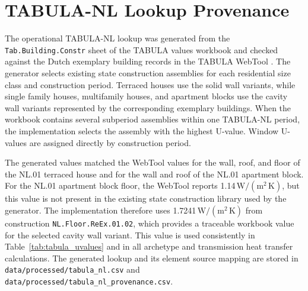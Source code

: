 \section{TABULA-NL Lookup Provenance}
\label{sec:appendix_a_tabula}

The operational TABULA-NL lookup was generated from the \texttt{Tab.Building.Constr} sheet of the TABULA values workbook and checked against the Dutch exemplary building records in the TABULA WebTool \parencite{loga2016,tabulawebtool}.
The generator selects existing state construction assemblies for each residential size class and construction period.
Terraced houses use the solid wall variants, while single family houses, multifamily houses, and apartment blocks use the cavity wall variants represented by the corresponding exemplary buildings.
When the workbook contains several subperiod assemblies within one TABULA-NL period, the implementation selects the assembly with the highest U-value.
Window U-values are assigned directly by construction period.

The generated values matched the WebTool values for the wall, roof, and floor of the NL.01 terraced house and for the wall and roof of the NL.01 apartment block.
For the NL.01 apartment block floor, the WebTool reports 1.14\,$\mathrm{W/(m^2\,K)}$, but this value is not present in the existing state construction library used by the generator.
The implementation therefore uses 1.7241\,$\mathrm{W/(m^2\,K)}$ from construction \texttt{NL.Floor.ReEx.01.02}, which provides a traceable workbook value for the selected cavity wall variant.
This value is used consistently in Table~\ref{tab:tabula_uvalues} and in all archetype and transmission heat transfer calculations.
The generated lookup and its element source mapping are stored in \texttt{data/processed/tabula\_nl.csv} and \texttt{data/processed/tabula\_nl\_provenance.csv}.
